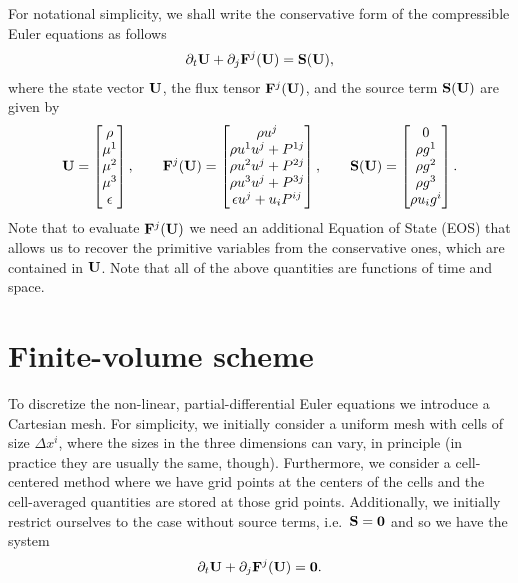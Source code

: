 \documentclass{article}
\begin{document}
For notational simplicity, we shall write the conservative form of the compressible Euler equations
 as follows
\begin{align}
  \label{eq:euler_vec}
  \partial_t \mathrm{\bf U} + \partial_j \mathrm{\bf F}^j(\mathrm{\bf U}) = \mathrm{\bf S}(\mathrm{\bf U}),
\end{align}
where the state vector $\mathrm{\bf U}$, the flux tensor $\mathrm{\bf F}^j(\mathrm{\bf U})$, and the source term
$\mathrm{\bf S}(\mathrm{\bf U})$ are given by
\begin{align}
  \label{eq:system_vecs}
  \mathrm{\bf U} =
    \begin{bmatrix}
      \rho  \\
      \mu^1 \\
      \mu^2 \\
      \mu^3 \\
      \epsilon
    \end{bmatrix}, \qquad
  \mathrm{\bf F}^j(\mathrm{\bf U}) =
    \begin{bmatrix}
      \rho u^j \\
      \rho u^1 u^j + P^{1j} \\
      \rho u^2 u^j + P^{2j} \\
      \rho u^3 u^j + P^{3j} \\
      \epsilon u^j + u_i P^{ij}
    \end{bmatrix}, \qquad
  \mathrm{\bf S}(\mathrm{\bf U}) =
    \begin{bmatrix}
      0 \\
      \rho g^1 \\
      \rho g^2 \\
      \rho g^3 \\
      \rho u_i g^i
    \end{bmatrix}.
\end{align}
Note that to evaluate $\mathrm{\bf F}^j(\mathrm{\bf U})$ we need an additional Equation of State (EOS) that allows us
to recover the primitive variables from the conservative ones, which are contained in $\mathrm{\bf U}$. Note
that all of the above quantities are functions of time and space.


\section{Finite-volume scheme}

To discretize the non-linear, partial-differential Euler equations  we introduce a Cartesian mesh. For simplicity, we initially consider a
uniform mesh with cells of size $\Delta x^i$, where the sizes in the three dimensions can vary, in
principle (in practice they are usually the same, though). Furthermore, we consider a cell-centered
method where we have grid points at the centers of the cells and the cell-averaged quantities are
stored at those grid points. Additionally, we initially restrict ourselves to the case without
source terms, i.e.\ $\mathrm{\bf S} = \mathrm{\bf 0}$ and so we have the system
\begin{align}
  \label{eq:sys}
  \partial_t \mathrm{\bf U} + \partial_j \mathrm{\bf F}^j(\mathrm{\bf U}) = \mathrm{\bf 0}.
\end{align}
\end{document}
